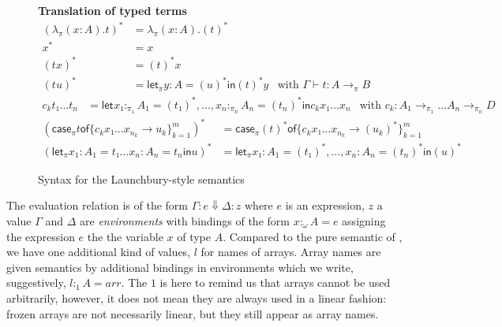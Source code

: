 \documentclass[acmsmall,screen]{acmart}\settopmatter{}
\newcommand{\case}[3][]{\mathsf{case}_{#1} #2 \mathsf{of} \{#3\}^m_{k=1}}
\newcommand{\flet}[1][]{\mathsf{let}_{#1} }
\newcommand{\fin}{ \mathsf{in} }
\newcommand{\figuresection}[1]{\par \addvspace{1em} \textbf{\sf #1}}
\begin{document}
{\begin{figure}
  \figuresection{Translation of typed terms}
  \begin{align*}
    (λ_π(x{:}A). t)^* &= λ_π(x{:}A). (t)^* \\
    x^*             &= x \\
    (t  x )^*     &= (t)^*  x \\
    (t  u )^*     &= \flet[π] y : A = (u)^* \fin (t)^*  y &
    \text{with $Γ⊢ t : A →_π B$}
  \end{align*}
  \begin{align*}
    c_k  t₁ … t_n   &= \flet x₁ :_{π_1} A_1 = (t₁)^*,…, x_n :_{π_n} A_n = (t_n)^*
                      \fin c_k x₁ … x_n & \text{with $c_k : A_1
                                          →_{π_1}…A_n →_{π_n}D$}
  \end{align*}
  \begin{align*}
    (\case[π] t {c_k  x₁ … x_{n_k} → u_k})^* &= \case[π] {(t)^*} {c_k  x₁ … x_{n_k} → (u_k)^*} \\
    (\flet[π] x_1: A_1= t₁  …  x_n : A_n = t_n \fin u)^* & = \flet[π] x₁:A_1 = (t₁)^*,…, x_n:A_n= (t_n)^* \fin (u)^*
  \end{align*}

  \caption{Syntax for the Launchbury-style semantics}
  \label{fig:launchbury:syntax}
\end{figure}

The evaluation relation is of the form $Γ : e ⇓ Δ : z$ where $e$ is an
expression, $z$ a value $Γ$ and $Δ$ are \emph{environments} with
bindings of the form $x :_ω A = e$ assigning the expression $e$ the the
variable $x$ of type $A$. Compared to the pure semantic of
\citeauthor{launchbury_natural_1993}, we have one additional kind of
values, $l$ for names of arrays. Array names are given semantics by
additional bindings in environments which we write, suggestively, $l
:_1 A = arr$. The $1$ is here to remind us that arrays cannot be used
arbitrarily, however, it does not mean they are always used in a
linear fashion: frozen arrays are not necessarily linear, but they
still appear as array names.

}
\end{document}

